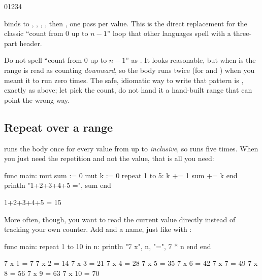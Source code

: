 \begin{progout}
01234
\end{progout}

 binds  to , , , ,
then , one pass per value. This is the direct replacement for the
classic ``count from 0 up to $n - 1$'' loop that other languages spell with a
three-part  header.

\begin{warn}
Do not spell ``count from 0 up to $n - 1$'' as .
It looks reasonable, but when  is  the range  is
read as counting \emph{downward}, so the body runs twice (for  and
) when you meant it to run zero times. The safe, idiomatic way to write that pattern is
, exactly as above; let  pick the count,
do not hand it a hand-built range that can point the wrong way.
\end{warn}

\subsection{Repeat over a range}

 runs the body once for every value from  up to
 \emph{inclusive}, so  runs five times. When you
just need the repetition and not the value, that is all you need:

\begin{salamen}
func main:
    mut sum := 0
    mut k := 0
    repeat 1 to 5:
        k += 1
        sum += k
    end
    println "1+2+3+4+5 =", sum
end
\end{salamen}

\begin{progout}
1+2+3+4+5 = 15
\end{progout}

More often, though, you want to read the current value directly instead of
tracking your own counter. Add  and a name, just like with
:

\begin{salamen}
func main:
    repeat 1 to 10 in n:
        println "7 x", n, "=", 7 * n
    end
end
\end{salamen}

\begin{progout}
7 x 1 = 7
7 x 2 = 14
7 x 3 = 21
7 x 4 = 28
7 x 5 = 35
7 x 6 = 42
7 x 7 = 49
7 x 8 = 56
7 x 9 = 63
7 x 10 = 70
\end{progout}

